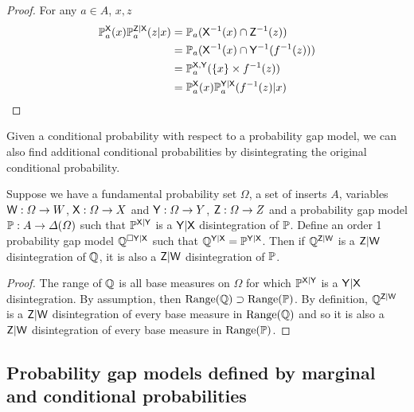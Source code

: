 \begin{proof}
For any $a\in A$, $x,z$
\begin{align}
\mathbb{P}_a^{\mathsf{X}}(x)\mathbb{P}_a^{\mathsf{Z}|\mathsf{X}}(z|x) &= \mathbb{P}_a(\mathsf{X}^{-1}(x)\cap\mathsf{Z}^{-1}(z))\\
					   &= \mathbb{P}_a(\mathsf{X}^{-1}(x)\cap\mathsf{Y}^{-1}(f^{-1}(z)))\\
					   &= \mathbb{P}_a^{\mathsf{X},\mathsf{Y}}(\{x\}\times f^{-1}(z))\\
					   &= \mathbb{P}_a^{\mathsf{X}}(x)\mathbb{P}_a^{\mathsf{Y}|\mathsf{X}}(f^{-1}(z)|x)
\end{align}
\end{proof}

Given a conditional probability with respect to a probability gap model, we can also find additional conditional probabilities by disintegrating the original conditional probability.


\begin{theorem}\label{th:recursive-disint}
Suppose we have a fundamental probability set $\Omega$, a set of inserts $A$, variables $\mathsf{W}:\Omega\to W$, $\mathsf{X}:\Omega\to X$ and $\mathsf{Y}:\Omega\to Y$, $\mathsf{Z}:\Omega\to Z$ and a probability gap model $\mathbb{P}:A\to \Delta(\Omega)$ such that $\mathbb{P}^{\mathsf{X}|\mathsf{Y}}$ is a $\mathsf{Y}|\mathsf{X}$ disintegration of $\mathbb{P}$. Define an order 1 probability gap model $\mathbb{Q}^{\square \mathsf{Y}|\mathsf{X}}$ such that $\mathbb{Q}^{\mathsf{Y}|\mathsf{X}}=\mathbb{P}^{\mathsf{Y}|\mathsf{X}}$. Then if $\mathbb{Q}^{\mathsf{Z}|\mathsf{W}}$ is a $\mathsf{Z}|\mathsf{W}$ disintegration of $\mathbb{Q}$, it is also a $\mathsf{Z}|\mathsf{W}$ disintegration of $\mathbb{P}$.
\end{theorem}

\begin{proof}
The range of $\mathbb{Q}$ is all base measures on $\Omega$ for which $\mathbb{P}^{\mathsf{X}|\mathsf{Y}}$ is a $\mathsf{Y}|\mathsf{X}$ disintegration. By assumption, then $\text{Range}(\mathbb{Q})\supset\text{Range}(\mathbb{P})$. By definition, $\mathbb{Q}^{\mathsf{Z}|\mathsf{W}}$ is a $\mathsf{Z}|\mathsf{W}$ disintegration of every base measure in $\text{Range}(\mathbb{Q})$ and so it is also a $\mathsf{Z}|\mathsf{W}$ disintegration of every base measure in $\text{Range}(\mathbb{P})$.
\end{proof}

\subsection{Probability gap models defined by marginal and conditional probabilities}


